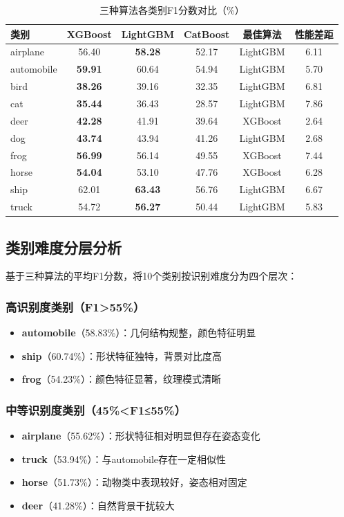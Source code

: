 \documentclass[UTF8]{report}
\theoremstyle{MyLineTheoremStyle} %
\theoremstyle{MyBlockTheoremStyle} %
\theoremstyle{MySubsubsectionStyle} %
\begin{document}
\begin{table}[H]
    \centering
    \caption{三种算法各类别F1分数对比（\%）}
    \begin{tabular}{lccccc}
        \toprule
        类别 & XGBoost & LightGBM & CatBoost & 最佳算法 & 性能差距 \\ \midrule
        airplane & 56.40 & \textbf{58.28} & 52.17 & LightGBM & 6.11 \\
        automobile & \textbf{59.91} & 60.64 & 54.94 & LightGBM & 5.70 \\
        bird & \textbf{38.26} & 39.16 & 32.35 & LightGBM & 6.81 \\
        cat & \textbf{35.44} & 36.43 & 28.57 & LightGBM & 7.86 \\
        deer & \textbf{42.28} & 41.91 & 39.64 & XGBoost & 2.64 \\
        dog & \textbf{43.74} & 43.94 & 41.26 & LightGBM & 2.68 \\
        frog & \textbf{56.99} & 56.14 & 49.55 & XGBoost & 7.44 \\
        horse & \textbf{54.04} & 53.10 & 47.76 & XGBoost & 6.28 \\
        ship & 62.01 & \textbf{63.43} & 56.76 & LightGBM & 6.67 \\
        truck & 54.72 & \textbf{56.27} & 50.44 & LightGBM & 5.83 \\ \bottomrule
    \end{tabular}
\end{table}

\subsection{类别难度分层分析}
基于三种算法的平均F1分数，将10个类别按识别难度分为四个层次：
\subsubsection{高识别度类别（F1>55\%）}
\begin{itemize}
    \item \textbf{automobile}（58.83\%）：几何结构规整，颜色特征明显
    \item \textbf{ship}（60.74\%）：形状特征独特，背景对比度高
    \item \textbf{frog}（54.23\%）：颜色特征显著，纹理模式清晰
\end{itemize}
\subsubsection{中等识别度类别（45\%<F1≤55\%）}
\begin{itemize}
    \item \textbf{airplane}（55.62\%）：形状特征相对明显但存在姿态变化
    \item \textbf{truck}（53.94\%）：与automobile存在一定相似性
    \item \textbf{horse}（51.73\%）：动物类中表现较好，姿态相对固定
    \item \textbf{deer}（41.28\%）：自然背景干扰较大
\end{itemize}
\end{document}
